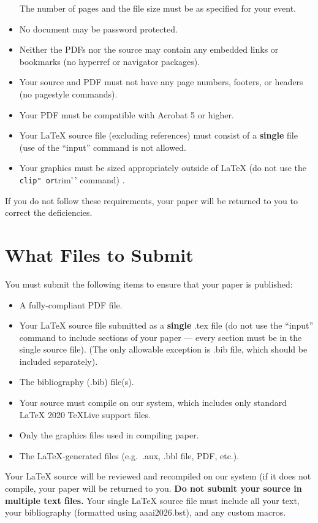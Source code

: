 \begin{itemize}
  The number of pages and the file size must be as specified for your
  event.
\item
  No document may be password protected.
\item
  Neither the PDFs nor the source may contain any embedded links or
  bookmarks (no hyperref or navigator packages).
\item
  Your source and PDF must not have any page numbers, footers, or
  headers (no pagestyle commands).
\item
  Your PDF must be compatible with Acrobat 5 or higher.
\item
  Your {\LaTeX} source file (excluding references) must consist of a
  \textbf{single} file (use of the ``input'' command is not allowed.
\item
  Your graphics must be sized appropriately outside of {\LaTeX} (do not
  use the \texttt{clip"\ or}trim'\,' command) .
\end{itemize}

If you do not follow these requirements, your paper will be returned to
you to correct the deficiencies.

\section{What Files to Submit}\label{what-files-to-submit}

You must submit the following items to ensure that your paper is
published:

\begin{itemize}
\tightlist
\item
  A fully-compliant PDF file.
\item
  Your {\LaTeX} source file submitted as a \textbf{single} .tex file (do
  not use the ``input'' command to include sections of your paper ---
  every section must be in the single source file). (The only allowable
  exception is .bib file, which should be included separately).
\item
  The bibliography (.bib) file(s).
\item
  Your source must compile on our system, which includes only standard
  {\LaTeX} 2020 TeXLive support files.
\item
  Only the graphics files used in compiling paper.
\item
  The {\LaTeX}-generated files (e.g.~.aux, .bbl file, PDF, etc.).
\end{itemize}

Your {\LaTeX} source will be reviewed and recompiled on our system (if
it does not compile, your paper will be returned to you. \textbf{Do not
submit your source in multiple text files.} Your single {\LaTeX} source
file must include all your text, your bibliography (formatted using
aaai2026.bst), and any custom macros.

